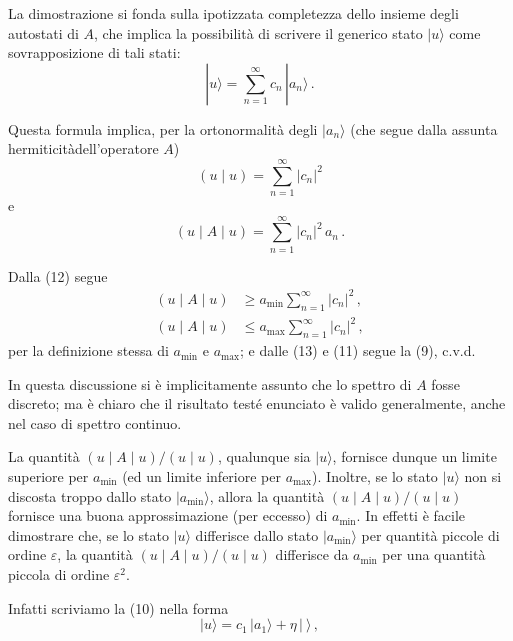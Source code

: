 \documentclass[11pt, a4paper]{book}
\numberwithin{equation}{section}
\begin{document}

La dimostrazione si fonda sulla ipotizzata completezza dello
insieme degli autostati di $A$, che implica la possibilità di scrivere
il generico stato $|u\rangle$ come sovrapposizione di tali stati:
\begin{equation}
|u\rangle = \sum_{n=1}^{\infty} c_n\, |a_n\rangle \,. \tag{10}
\end{equation}

Questa formula implica, per la ortonormalità degli $|a_n\rangle$ (che segue
dalla assunta hermiticitàdell'operatore $A$)
\begin{equation}
(u \mid u) = \sum_{n=1}^{\infty} |c_n|^2 \tag{11}
\end{equation}
e
\begin{equation}
(u \mid A \mid u) = \sum_{n=1}^{\infty} |c_n|^2\, a_n \,. \tag{12}
\end{equation}

Dalla (12) segue
\begin{align}
(u \mid A \mid u) &\geq a_{\min} \sum_{n=1}^{\infty} |c_n|^2 \,, \tag{13a} \\
(u \mid A \mid u) &\leq a_{\max} \sum_{n=1}^{\infty} |c_n|^2 \,, \tag{13b}
\end{align}
per la definizione stessa di $a_{\min}$ e $a_{\max}$; e dalle (13) e (11) segue
la (9), c.v.d.

In questa discussione si è implicitamente assunto che lo spettro di
$A$ fosse discreto; ma è chiaro che il risultato testé enunciato è valido
generalmente, anche nel caso di spettro continuo.

La quantità $(u \mid A \mid u) / (u \mid u)$, qualunque sia $|u\rangle$,
fornisce dunque un limite superiore per $a_{\min}$ (ed un limite inferiore
per $a_{\max}$). Inoltre, se lo stato $|u\rangle$ non si discosta troppo dallo
stato $|a_{\min}\rangle$, allora la quantità $(u \mid A \mid u) / (u \mid u)$ fornisce
una buona approssimazione (per eccesso) di $a_{\min}$. In effetti è
facile dimostrare che, se lo stato $|u\rangle$ differisce dallo stato $|a_{\min}\rangle$
per quantità piccole di ordine $\varepsilon$, la quantità $(u \mid A \mid u) / (u \mid u)$
differisce da $a_{\min}$ per una quantità piccola di ordine $\varepsilon^2$.

Infatti scriviamo la (10) nella forma
\begin{equation}
|u\rangle = c_1\, |a_1\rangle + \eta\, |\ \rangle \,, \tag{14}
\end{equation}

\end{document}
